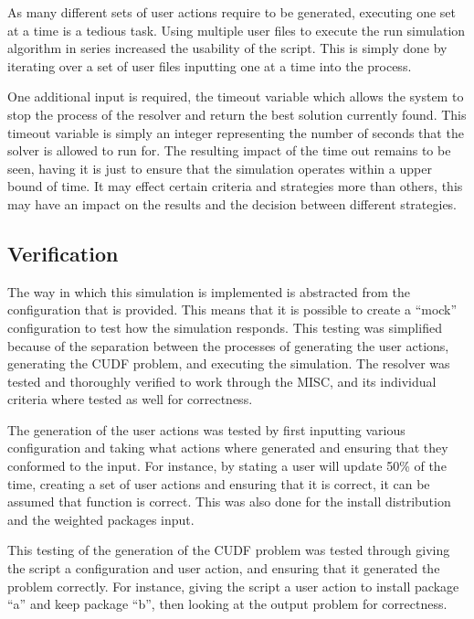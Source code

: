 As many different sets of user actions require to be generated, executing one set at a time is a tedious task.
Using multiple user files to execute the run simulation algorithm in series increased the usability of the script.
This is simply done by iterating over a set of user files inputting one at a time into the process. 

One additional input is required, the timeout variable which allows the system to stop the process of the resolver and return the best solution currently found.
This timeout variable is simply an integer representing the number of seconds that the solver is allowed to run for.
The resulting impact of the time out remains to be seen, having it is just to ensure that the simulation operates within a upper bound of time.
It may effect certain criteria and strategies more than others, this may have an impact on the results and the decision between different strategies.

\subsection{Verification}
The way in which this simulation is implemented is abstracted from the configuration that is provided.
This means that it is possible to create a ``mock'' configuration to test how the simulation responds.
This testing was simplified because of the separation between the processes of generating the user actions, generating the CUDF problem, and executing the simulation.
The resolver was tested and thoroughly verified to work through the MISC, and its individual criteria where tested as well for correctness.

The generation of the user actions was tested by first inputting various configuration and taking what actions where generated and ensuring that they conformed to the input.
For instance, by stating a user will update 50\% of the time, creating a set of user actions and ensuring that it is correct, it can be assumed that function is correct.
This was also done for the install distribution and the weighted packages input.

This testing of the generation of the CUDF problem was tested through giving the script a configuration and user action, and ensuring that it generated the problem correctly. 
For instance, giving the script a user action to install package ``a'' and keep package ``b'', then looking at the output problem for correctness.

